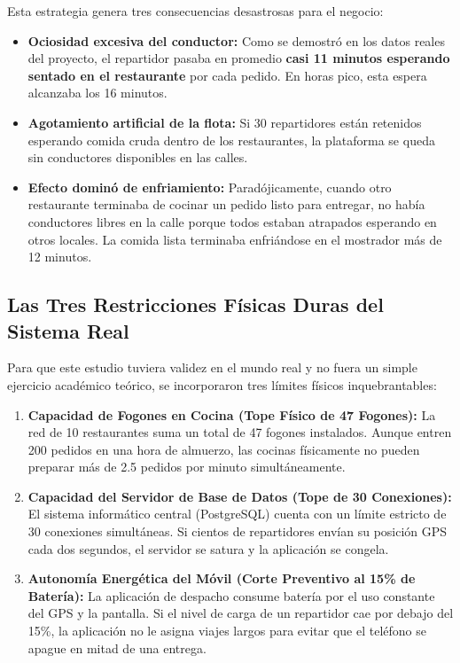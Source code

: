 \documentclass[11pt,a4paper]{article}
\begin{document}
Esta estrategia genera tres consecuencias desastrosas para el negocio:
\begin{itemize}[leftmargin=*]
    \item \textbf{Ociosidad excesiva del conductor:} Como se demostró en los datos reales del proyecto, el repartidor pasaba en promedio \textbf{casi 11 minutos esperando sentado en el restaurante} por cada pedido. En horas pico, esta espera alcanzaba los 16 minutos.
    \item \textbf{Agotamiento artificial de la flota:} Si 30 repartidores están retenidos esperando comida cruda dentro de los restaurantes, la plataforma se queda sin conductores disponibles en las calles.
    \item \textbf{Efecto dominó de enfriamiento:} Paradójicamente, cuando otro restaurante terminaba de cocinar un pedido listo para entregar, no había conductores libres en la calle porque todos estaban atrapados esperando en otros locales. La comida lista terminaba enfriándose en el mostrador más de 12 minutos.
\end{itemize}

\subsection{Las Tres Restricciones Físicas Duras del Sistema Real}
Para que este estudio tuviera validez en el mundo real y no fuera un simple ejercicio académico teórico, se incorporaron tres límites físicos inquebrantables:
\begin{enumerate}[label=\textbf{\alph*.}]
    \item \textbf{Capacidad de Fogones en Cocina (Tope Físico de 47 Fogones):} La red de 10 restaurantes suma un total de 47 fogones instalados. Aunque entren 200 pedidos en una hora de almuerzo, las cocinas físicamente no pueden preparar más de 2.5 pedidos por minuto simultáneamente.
    \item \textbf{Capacidad del Servidor de Base de Datos (Tope de 30 Conexiones):} El sistema informático central (PostgreSQL) cuenta con un límite estricto de 30 conexiones simultáneas. Si cientos de repartidores envían su posición GPS cada dos segundos, el servidor se satura y la aplicación se congela.
    \item \textbf{Autonomía Energética del Móvil (Corte Preventivo al 15\% de Batería):} La aplicación de despacho consume batería por el uso constante del GPS y la pantalla. Si el nivel de carga de un repartidor cae por debajo del 15\%, la aplicación no le asigna viajes largos para evitar que el teléfono se apague en mitad de una entrega.
\end{enumerate}
\end{document}
